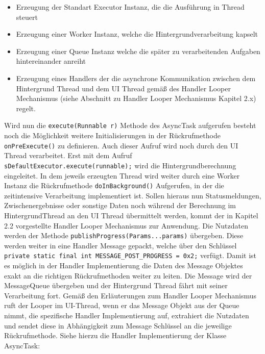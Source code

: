\documentclass[12pt,oneside,a4paper,bibtotoc,liststotoc]{scrreprt}
\begin{document}
\begin{itemize}
\item Erzeugung der Standart Executor Instanz, die die Ausführung in Thread steuert
\item Erzeugung einer Worker Instanz, welche die Hintergrundverarbeitung kapselt
\item Erzeugung einer Queue Instanz welche die später zu verarbeitenden Aufgaben hintereinander anreiht
\item Erzeugung eines Handlers der die asynchrone Kommunikation zwischen dem Hintergrund Thread und dem UI Thread gemäß des Handler Looper Mechanismus (siehe Abschnitt zu Handler Looper Mechanismus Kapitel 2.x) regelt.
\end{itemize}
Wird nun die \texttt{execute(Runnable r)} Methode des AsyncTask aufgerufen besteht noch die Möglichkeit weitere Initialisierungen in der Rückrufmethode \texttt{onPreExecute()} zu definieren. Auch dieser Aufruf wird noch durch den UI Thread verarbeitet. Erst mit dem Aufruf 
\texttt{sDefaultExecutor.execute(runnable);} wird die Hintergrundberechnung eingeleitet. In dem jeweils erzeugten Thread wird weiter durch eine Worker Instanz die Rückrufmethode \texttt{doInBackground()} Aufgerufen, in der die zeitintensive Verarbeitung implementiert ist. Sollen hieraus nun Statusmeldungen, Zwischenergebnisse oder sonstige Daten noch während der Berechnung im HintergrundThread an den UI Thread übermittelt werden, kommt der in Kapitel 2.2 vorgestellte Handler Looper Mechanismus zur Anwendung. Die Nutzdaten werden der Methode \texttt{publishProgress(Params...params)} übergeben. Diese werden weiter in eine Handler Message gepackt, welche über den Schlüssel \newline
\texttt{private static final int MESSAGE\_POST\_PROGRESS = 0x2;}\newline
verfügt. Damit ist es möglich in der Handler Implementierung die Daten des Message Objektes exakt an die richtigen Rückrufmethoden weiter zu leiten. Die Message wird der MessageQueue übergeben und der Hintergrund Thread fährt mit seiner Verarbeitung fort. Gemäß den Erläuterungen zum Handler Looper Mechanismus ruft der Looper im UI-Thread, wenn er das Message Objekt aus der Queue nimmt, die spezifische Handler Implementierung auf, extrahiert die Nutzdaten und sendet diese in Abhängigkeit zum Message Schlüssel an die jeweilige Rückrufmethode. Siehe hierzu die Handler Implementierung der Klasse AsyncTask:\newline
\end{document}
